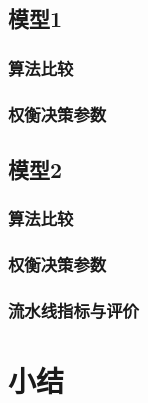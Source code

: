 \subsection{模型1}

\subsubsection{算法比较}
\subsubsection{权衡决策参数}

\subsection{模型2}
\subsubsection{算法比较}
\subsubsection{权衡决策参数}
\subsubsection{流水线指标与评价}

\section{小结}